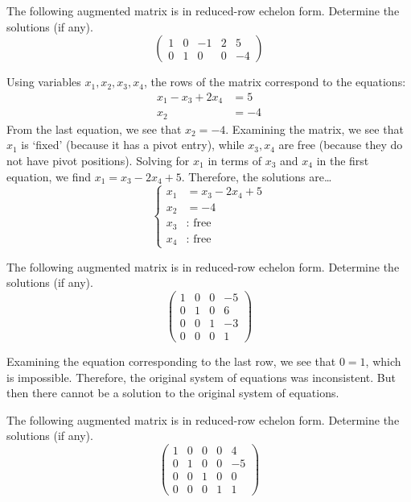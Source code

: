 \documentclass[11pt,letterpaper]{article}
\begin{document}

 The following augmented matrix is in reduced-row echelon form. Determine the solutions (if any). 
	\[
	\begin{pmatrix}
	1 & 0 & -1 & 2 & 5 \\
	0 & 1 & 0 & 0 & -4 
	\end{pmatrix}
	\] \pspace

\sol Using variables $x_1, x_2, x_3, x_4$, the rows of the matrix correspond to the equations:
	\[
	\begin{aligned}
	x_1 - x_3 + 2x_4&= 5 \\
	x_2&= -4
	\end{aligned}
	\]
From the last equation, we see that $x_2= -4$. Examining the matrix, we see that $x_1$ is `fixed' (because it has a pivot entry), while $x_3, x_4$ are free (because they do not have pivot positions). Solving for $x_1$ in terms of $x_3$ and $x_4$ in the first equation, we find $x_1= x_3 - 2x_4 + 5$. Therefore, the solutions are\dots
	\[
	\left\{
	\begin{aligned}
	x_1&= x_3 - 2x_4 + 5 \\
	x_2&= -4 \\
	x_3&: \text{ free} \\
	x_4&: \text{ free}
	\end{aligned} \right.
	\]



\newpage



 The following augmented matrix is in reduced-row echelon form. Determine the solutions (if any). 
	\[
	\begin{pmatrix}
	1 & 0 & 0 & -5 \\
	0 & 1 & 0 & 6 \\
	0 & 0 & 1 & -3 \\
	0 & 0 & 0 & 1
	\end{pmatrix}
	\] \pspace

\sol Examining the equation corresponding to the last row, we see that $0= 1$, which is impossible. Therefore, the original system of equations was inconsistent. But then there cannot be a solution to the original system of equations. 



\newpage



 The following augmented matrix is in reduced-row echelon form. Determine the solutions (if any). 
	\[
	\begin{pmatrix}
	1 & 0 & 0 & 0 & 4 \\
	0 & 1 & 0 & 0 & -5 \\
	0 & 0 & 1 & 0 & 0 \\
	0 & 0 & 0 & 1 & 1
	\end{pmatrix}
	\] \pspace
\end{document}
